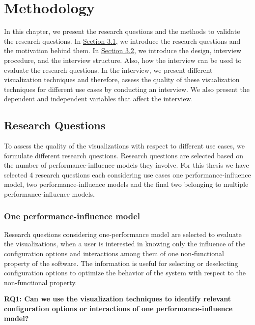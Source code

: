 \chapter{Methodology}
\label{methodology}

In this chapter, we present the research questions and the methods to validate the research questions. In \hyperref[sec:3.1]{Section 3.1}, we introduce the research questions and the motivation behind them. In \hyperref[sec:3.2]{Section 3.2}, we introduce the design, interview procedure, and the interview structure.  Also, how the interview can be used to evaluate the research questions. In the interview, we present different visualization techniques and therefore, assess the quality of these visualization techniques for different use cases by conducting an interview. We also present the dependent and independent variables that affect the interview.

\section{Research Questions}
\label{sec:3.1}
To assess the quality of the visualizations with respect to different use cases, we formulate different research questions. Research questions are selected based on the number of performance-influence models they involve. For this thesis we have selected 4 research questions each considering use cases one performance-influence model, two performance-influence models and the final two belonging to multiple performance-influence models. 

\subsection{One performance-influence model}

Research questions considering one-performance model are selected to evaluate the visualizations, when a user is interested in knowing only the influence of the configuration options and interactions among them of one non-functional property of the software.
The information is useful for selecting or deselecting configuration options to optimize the behavior of the system with respect to the non-functional property. 

\begin{mdframed}
\textbf{RQ1: Can we use the visualization techniques to identify relevant configuration options or interactions of one performance-influence model?}
\end{mdframed}


